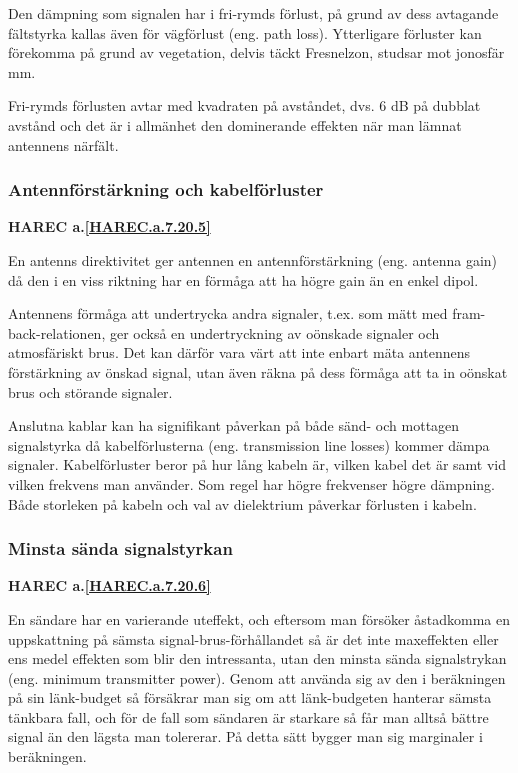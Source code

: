Den dämpning som signalen har i fri-rymds förlust, på grund av dess avtagande
fältstyrka kallas även för vägförlust (eng. path loss).
Ytterligare förluster kan förekomma på grund av vegetation, delvis täckt
Fresnelzon, studsar mot jonosfär mm.

Fri-rymds förlusten avtar med kvadraten på avståndet, dvs. 6 dB på dubblat
avstånd och det är i allmänhet den dominerande effekten när man lämnat
antennens närfält.

\subsubsection{Antennförstärkning och kabelförluster}
\textbf{HAREC a.\ref{HAREC.a.7.20.5}\label{myHAREC.a.7.20.5}}

En antenns direktivitet ger antennen en antennförstärkning (eng. antenna gain)
då den i en viss riktning har en förmåga att ha högre gain än en enkel dipol.

Antennens förmåga att undertrycka andra signaler, t.ex. som mätt med
fram-back-relationen, ger också en undertryckning av oönskade signaler och
atmosfäriskt brus.
Det kan därför vara värt att inte enbart mäta antennens förstärkning av
önskad signal, utan även räkna på dess förmåga att ta in oönskat brus och
störande signaler.

Anslutna kablar kan ha signifikant påverkan på både sänd- och mottagen
signalstyrka då kabelförlusterna (eng. transmission line losses) kommer dämpa
signaler.
Kabelförluster beror på hur lång kabeln är, vilken kabel det är samt vid
vilken frekvens man använder.
Som regel har högre frekvenser högre dämpning.
Både storleken på kabeln och val av dielektrium påverkar förlusten i kabeln.


\subsubsection{Minsta sända signalstyrkan}
\textbf{HAREC a.\ref{HAREC.a.7.20.6}\label{myHAREC.a.7.20.6}}

En sändare har en varierande uteffekt, och eftersom man försöker åstadkomma en
uppskattning på sämsta signal-brus-förhållandet så är det inte maxeffekten
eller ens medel effekten som blir den intressanta, utan den minsta sända
signalstrykan (eng. minimum transmitter power).
Genom att använda sig av den i beräkningen på sin länk-budget så försäkrar man
sig om att länk-budgeten hanterar sämsta tänkbara fall, och för de fall som
sändaren är starkare så får man alltså bättre signal än den lägsta man
tolererar.
På detta sätt bygger man sig marginaler i beräkningen.
